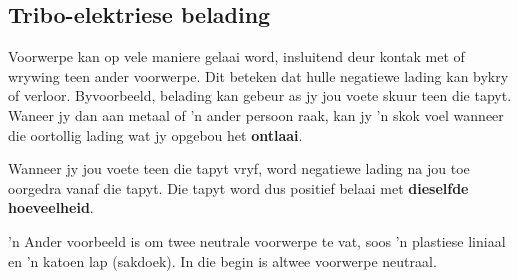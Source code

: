 \subsection{Tribo-elektriese belading}
\nopagebreak
Voorwerpe kan op vele maniere gelaai word, insluitend deur kontak met of wrywing teen ander voorwerpe. Dit beteken dat hulle negatiewe lading kan bykry of verloor. Byvoorbeeld, belading kan gebeur as jy jou voete skuur teen die tapyt. Waneer jy dan aan metaal of 'n ander persoon raak, kan jy 'n skok voel wanneer die oortollig lading wat jy opgebou het \textbf{ontlaai}.\par


Wanneer jy jou voete teen die tapyt vryf, word negatiewe lading na jou toe oorgedra vanaf die tapyt. Die tapyt word dus positief belaai met \textbf{dieselfde hoeveelheid}. \par
      

'n Ander voorbeeld is om twee neutrale voorwerpe te vat, soos 'n plastiese liniaal en 'n katoen lap (sakdoek). In die begin is altwee voorwerpe neutraal.\par
      

